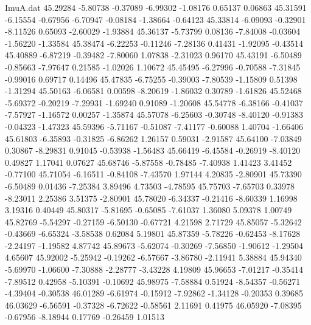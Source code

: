 \begin{filecontents}{ImuA.dat}
  45.29284   -5.80738   -0.37089   -6.99302   -1.08176    0.65137    0.06863
  45.31591   -6.15554   -0.67956   -6.70947   -0.08184   -1.38664   -0.64123
  45.33814   -6.09093   -0.32901   -8.11526    0.65093   -2.60029   -1.93884
  45.36137   -5.73799    0.08136   -7.84008   -0.03604   -1.56220   -1.33584
  45.38474   -6.22253   -0.11246   -7.28136    0.41431   -1.92095   -0.43514
  45.40889   -6.87219   -0.39482   -7.80060    1.07838   -2.31023    0.96170
  45.43191   -6.50489   -0.85663   -7.97647    0.21585   -1.02026    1.10672
  45.45495   -6.27996   -0.70588   -7.31845   -0.99016    0.69717    0.14496
  45.47835   -6.75255   -0.39003   -7.80539   -1.15809    0.51398   -1.31294
  45.50163   -6.06581    0.00598   -8.20619   -1.86032    0.30789   -1.61826
  45.52468   -5.69372   -0.20219   -7.29931   -1.69240    0.91089   -1.20608
  45.54778   -6.38166   -0.41037   -7.57927   -1.16572    0.00257   -1.35874
  45.57078   -6.25603   -0.30748   -8.40120   -0.91383   -0.04323   -1.47323
  45.59396   -5.71167   -0.51087   -7.41177   -0.60088    1.40704   -1.66406
  45.61803   -6.35893   -0.31825   -6.86262    1.26157    0.59031   -2.91587
  45.64100   -7.03849    0.30867   -8.29831    0.91045   -0.53938   -1.56483
  45.66419   -6.45584   -0.26919   -8.40120    0.49827    1.17041    0.07627
  45.68746   -5.87558   -0.78485   -7.40938    1.41423    3.41452   -0.77100
  45.71054   -6.16511   -0.84108   -7.43570    1.97144    4.20835   -2.80901
  45.73390   -6.50489    0.01436   -7.25384    3.89496    4.73503   -4.78595
  45.75703   -7.65703    0.33978   -8.23011    2.25386    3.51375   -2.80901
  45.78020   -6.34337   -0.21416   -8.60339    1.16998    3.19316    0.40449
  45.80317   -5.81695   -0.65085   -7.61037    1.36080    5.09378    1.00749
  45.82769   -5.54297   -0.27159   -6.50130   -0.67721    4.21598    2.71729
  45.85057   -5.32642   -0.43669   -6.65324   -3.58538    0.62084    5.19801
  45.87359   -5.78226   -0.62453   -8.17628   -2.24197   -1.19582    4.87742
  45.89673   -5.62074   -0.30269   -7.56850   -1.90612   -1.29504    4.65607
  45.92002   -5.25942   -0.19262   -6.57667   -3.86780   -2.11941    5.38884
  45.94340   -5.69970   -1.06600   -7.30888   -2.28777   -3.43228    4.19809
  45.96653   -7.01217   -0.35414   -7.89512    0.42958   -5.10391   -0.10692
  45.98975   -7.58884    0.51924   -8.54357   -0.56271   -4.39404   -0.30538
  46.01289   -6.61974   -0.15912   -7.92862   -1.34128   -0.20353    0.39685
  46.03629   -6.56591   -0.37328   -6.72622   -0.58561    2.11691    0.41975
  46.05920   -7.08395   -0.67956   -8.18944    0.17769   -0.26459    1.01513

\end{filecontents}
